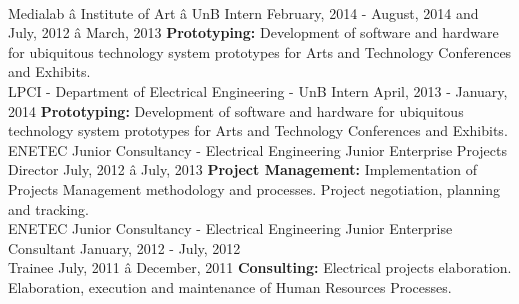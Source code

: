 \documentclass[a4paper]{twentysecondcv} %
\begin{document}
\begin{twenty}
{            \color{pblue}{\hspace{8pt}-\hspace{4pt}} 
        }
        \\
    \twentyitem
    	{Medialab â Institute of Art â UnB}
		{Intern}
		{February, 2014 - August, 2014 and July, 2012 â March, 2013}
        {
            \color{pblue}{\hspace{8pt}-\hspace{4pt}} \color{black}\textbf{Prototyping: }Development of software and hardware for ubiquitous technology system prototypes for Arts and Technology Conferences and Exhibits.
        }
        \\
    \twentyitem
    {LPCI - Department of Electrical Engineering - UnB}
    {Intern}
    {April, 2013 - January, 2014}
    {
        \color{pblue}{\hspace{8pt}-\hspace{4pt}} \color{black}\textbf{Prototyping: }Development of software and hardware for ubiquitous technology system prototypes for Arts and Technology Conferences and Exhibits.
    }
    \\
    \twentyitem
    {ENETEC Junior Consultancy - Electrical Engineering Junior Enterprise}
    {Projects Director}
    {July, 2012 â July, 2013}
    {\color{pblue}{\hspace{8pt}-\hspace{4pt}} \color{black}\textbf{Project Management: }Implementation of Projects Management methodology and processes. Project negotiation, planning and tracking.}
    \\
    \twentyitem
    {ENETEC Junior Consultancy - Electrical Engineering Junior Enterprise}
    {Consultant \hfill January, 2012 - July, 2012\\}
    {Trainee  \hfill July, 2011 â December, 2011}
    {\color{pblue}{\hspace{8pt}-\hspace{4pt}} \color{black}\textbf{Consulting: }Electrical projects elaboration. Elaboration, execution and maintenance of Human Resources Processes.}
\end{twenty}

\end{document}
